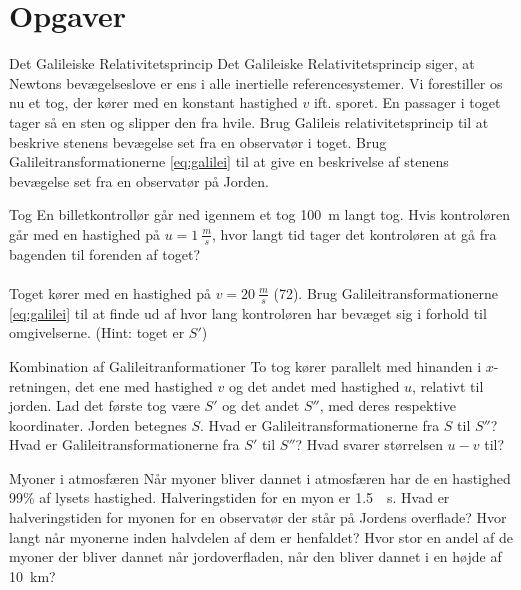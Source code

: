 \section{Opgaver}

\begin{opgave}{Det Galileiske Relativitetsprincip}%
Det Galileiske Relativitetsprincip siger, at Newtons bevægelseslove er ens i alle inertielle referencesystemer.
Vi forestiller os nu et tog, der kører med en konstant hastighed $v$ ift. sporet. En passager i toget tager så en sten og slipper den fra hvile.
\opg Brug Galileis relativitetsprincip til at beskrive stenens bevægelse set fra en observatør i toget.
\opg Brug Galileitransformationerne \eqref{eq:galilei} til at give en beskrivelse af stenens bevægelse set fra en observatør på Jorden.
\end{opgave}

\begin{opgave}{Tog}%
En billetkontrollør går ned igennem et tog \SI{100}{m} langt tog.
\opg Hvis kontroløren går med en hastighed på $u=\SI{1}{\frac{m}{s}}$, hvor langt tid tager det kontroløren at gå fra bagenden til forenden af toget?\\\\
%
Toget kører med en hastighed på $v=\SI{20}{\frac{m}{s}}$ (\SI{72}{}).
\opg  Brug Galileitransformationerne \eqref{eq:galilei} til at finde ud af hvor lang kontroløren har bevæget sig i forhold til omgivelserne.
(Hint: toget er $S'$)
\end{opgave}

\begin{opgave}{Kombination af Galileitranformationer}%
To tog kører parallelt med hinanden i $x$-retningen, det ene med hastighed $v$ og det andet med hastighed $u$, relativt til jorden. Lad det første tog være $S'$ og det andet $S''$, med deres respektive koordinater.
Jorden betegnes $S$.
\opg Hvad er Galileitransformationerne fra $S$ til $S''$?
\opg Hvad er Galileitransformationerne fra $S'$ til $S''$?
\opg Hvad svarer størrelsen $u-v$ til?
\end{opgave}

\begin{opgave}{Myoner i atmosfæren}
Når myoner bliver dannet i atmosfæren har de en hastighed 99\% af lysets hastighed.
Halveringstiden for en myon er \SI{1,5}{\mu s}.
\opg Hvad er halveringstiden for myonen for en observatør der står på Jordens overflade?
\opg Hvor langt når myonerne inden halvdelen af dem er henfaldet?
\opg Hvor stor en andel af de myoner der bliver dannet når jordoverfladen, når den bliver dannet i en højde af \SI{10}{km}?
\end{opgave}

